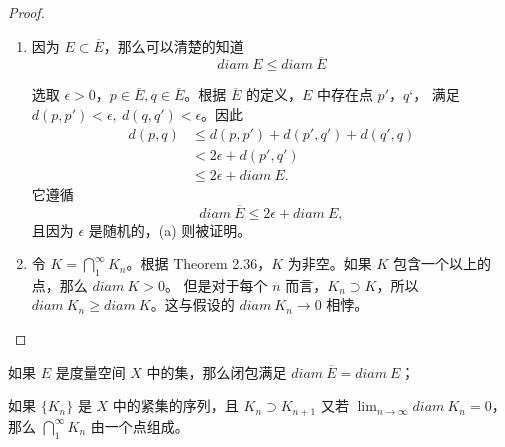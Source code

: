 \documentclass[../poma-notes.tex]{subfiles}
\begin{document}
\begin{proof}
  \begin{enumerate}[label=(\alph*)]
    \item 因为 $E \subset \overline{E}$，那么可以清楚的知道
          \[diam\ E \le diam\ \overline{E}\]

          选取 $\epsilon > 0$，$p \in \overline{E}, q \in \overline{E}$。根据 $\overline{E}$ 的定义，$E$ 中存在点 $p'$，$q‘$，
          满足 $d(p,p') < \epsilon,\ d(q,q') < \epsilon$。因此
          \begin{align*}
            \mathcal{} d(p,q) & \le d(p,p') + d(p',q') + d(q',q) \\
                              & < 2\epsilon + d(p',q')           \\
                              & \le 2\epsilon + diam\ E.
          \end{align*}
          它遵循
          \[diam\ \overline{E} \le 2\epsilon + diam\ E,\]
          且因为 $\epsilon$ 是随机的，(a) 则被证明。
    \item 令 $K = \bigcap_1^{\infty} K_n$。根据 Theorem 2.36，$K$ 为非空。如果 $K$ 包含一个以上的点，那么 $diam\ K > 0$。
          但是对于每个 $n$ 而言，$K_n \supset K$，所以 $diam\ K_n \ge diam\ K$。这与假设的 $diam\ K_n \to 0$ 相悖。
  \end{enumerate}
\end{proof}

\begin{anote}
  \begin{enumerate*}[label=(\alph*)]
    \item 如果 $E$ 是度量空间 $X$ 中的集，那么闭包满足 $diam\ \overline{E} = diam\ E$；
    \item 如果 $\{K_n\}$ 是 $X$ 中的紧集的序列，且 $K_n \supset K_{n+1}$ 又若 $\lim_{n \to \infty} diam\ K_n = 0$，
          那么 $\bigcap_1^{\infty} K_n$ 由一个点组成。
  \end{enumerate*}
\end{anote}
\end{document}
